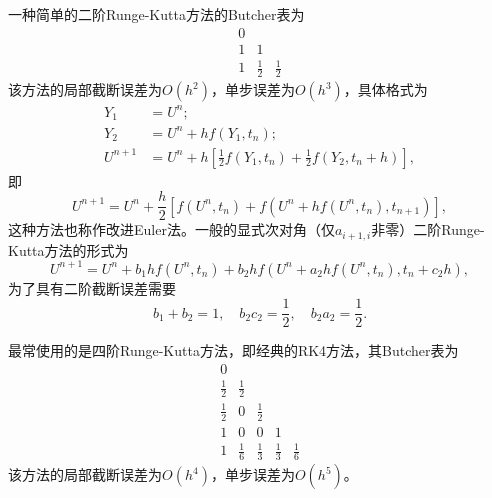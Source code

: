 \documentclass[a4paper,10pt]{ctexart}
\begin{document}
一种简单的二阶Runge-Kutta方法的Butcher表为
\begin{equation}
    \begin{array}{c|cc}
        0 &  &  \\
        1 & 1 &  \\\hline
        1 & \frac{1}{2} & \frac{1}{2}
    \end{array}
\end{equation}
该方法的局部截断误差为$ O(h^2) $，单步误差为$ O(h^3) $，具体格式为
\begin{equation}
    \begin{aligned}
        Y_1 &= U^n;\\
        Y_2 &= U^n + h f(Y_1,t_n);\\
        U^{n+1} &= U^n + h\left[ \frac{1}{2}f(Y_1,t_n) + \frac{1}{2}f(Y_2,t_n+h) \right],
    \end{aligned}
\end{equation}
即
\begin{equation}
    U^{n+1} = U^n + \frac{h}{2}\left[ f(U^n,t_n)+f(U^n+hf(U^n,t_n), t_{n+1}) \right],
\end{equation}
这种方法也称作改进Euler法。一般的显式次对角（仅$ a_{i+1,i} $非零）二阶Runge-Kutta方法的形式为
\[
    U^{n+1} = U^n + b_1hf(U^n,t_n) + b_2hf(U^n+a_2hf(U^n,t_n),t_n+c_2h),
\]
为了具有二阶截断误差需要
\[
    b_1+b_2 = 1,\quad b_2c_2 = \frac{1}{2},\quad b_2a_2 = \frac{1}{2}.
\]

最常使用的是四阶Runge-Kutta方法，即经典的RK4方法，其Butcher表为
\begin{equation}
    \begin{array}{c|cccc}
        0 &  &  &  &  \\
        \frac{1}{2} & \frac{1}{2} &  &  &  \\
        \frac{1}{2} & 0 & \frac{1}{2} &  &  \\
        1 & 0 & 0 & 1 &  \\\hline
        1 & \frac{1}{6} & \frac{1}{3} & \frac{1}{3} & \frac{1}{6}
    \end{array}
\end{equation}
该方法的局部截断误差为$ O(h^4) $，单步误差为$ O(h^5) $。
\end{document}
